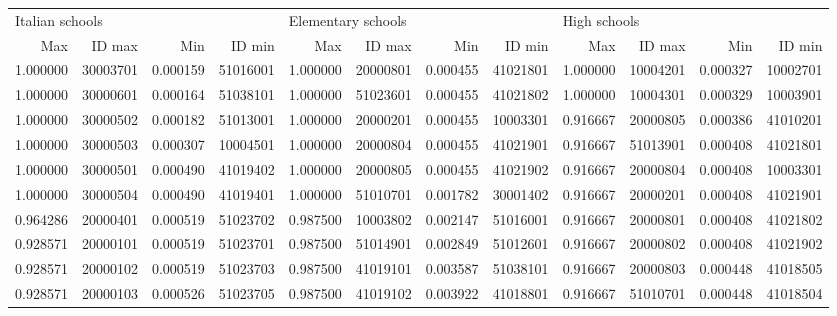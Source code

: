 \documentclass[12pt]{article}
\begin{document}
\begin{landscape}
\begin{table}
\begin{tabular}{rrrr|rrrr|rrrr}
		\end{tabular}

		\begin{tabular}{rrrr|rrrr|rrrr}
			\toprule
			\multicolumn{4}{l}{Italian schools} & \multicolumn{4}{l}{Elementary schools} & \multicolumn{4}{l}{High schools} \\
				 Max &   ID max &      Min &   ID min &    Max &   ID max &      Min &   ID min &      Max &   ID max &      Min &   ID min \\
			\midrule
			1.000000 & 30003701 & 0.000159 & 51016001 & 1.000000 & 20000801 & 0.000455 & 41021801 & 1.000000 & 10004201 & 0.000327 & 10002701 \\
			1.000000 & 30000601 & 0.000164 & 51038101 & 1.000000 & 51023601 & 0.000455 & 41021802 & 1.000000 & 10004301 & 0.000329 & 10003901 \\
			1.000000 & 30000502 & 0.000182 & 51013001 & 1.000000 & 20000201 & 0.000455 & 10003301 & 0.916667 & 20000805 & 0.000386 & 41010201 \\
			1.000000 & 30000503 & 0.000307 & 10004501 & 1.000000 & 20000804 & 0.000455 & 41021901 & 0.916667 & 51013901 & 0.000408 & 41021801 \\
			1.000000 & 30000501 & 0.000490 & 41019402 & 1.000000 & 20000805 & 0.000455 & 41021902 & 0.916667 & 20000804 & 0.000408 & 10003301 \\
			1.000000 & 30000504 & 0.000490 & 41019401 & 1.000000 & 51010701 & 0.001782 & 30001402 & 0.916667 & 20000201 & 0.000408 & 41021901 \\
			0.964286 & 20000401 & 0.000519 & 51023702 & 0.987500 & 10003802 & 0.002147 & 51016001 & 0.916667 & 20000801 & 0.000408 & 41021802 \\
			0.928571 & 20000101 & 0.000519 & 51023701 & 0.987500 & 51014901 & 0.002849 & 51012601 & 0.916667 & 20000802 & 0.000408 & 41021902 \\
			0.928571 & 20000102 & 0.000519 & 51023703 & 0.987500 & 41019101 & 0.003587 & 51038101 & 0.916667 & 20000803 & 0.000448 & 41018505 \\
			0.928571 & 20000103 & 0.000526 & 51023705 & 0.987500 & 41019102 & 0.003922 & 41018801 & 0.916667 & 51010701 & 0.000448 & 41018504 \\
			
			\end{tabular}


\end{table}
\end{landscape}
\end{document}
